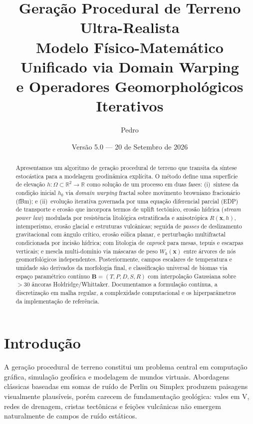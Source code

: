 \documentclass[11pt,a4paper]{article}
\title{%
  \textbf{Geração Procedural de Terreno Ultra-Realista}\\[0.4em]
  \large Modelo Físico-Matemático Unificado via Domain Warping\\
  e Operadores Geomorphológicos Iterativos
}
\author{Pedro}
\date{Versão 5.0 --- 20 de Setembro de 2026}
\begin{document}
\maketitle

\begin{abstract}
Apresentamos um algoritmo de geração procedural de terreno que transita da síntese estocástica
para a modelagem geodinâmica explícita. O método define uma superfície de elevação
$h : \Omega \subset \mathbb{R}^2 \to \mathbb{R}$ como solução de um processo em duas fases:
(i)~síntese da condição inicial $h_0$ via \emph{domain warping} fractal sobre movimento
browniano fracionário (fBm); e (ii)~evolução iterativa governada por uma equação diferencial
parcial (EDP) de transporte e erosão que incorpora termos de uplift tectônico, erosão hídrica
(\emph{stream power law}) modulada por resistência litológica estratificada e anisotrópica
$R(\mathbf{x}, h)$, intemperismo, erosão glacial e estruturas vulcânicas; seguida de
\emph{passes} de deslizamento gravitacional com ângulo crítico, erosão eólica planar,
e perturbação multifractal condicionada por incisão hídrica; com litologia de \emph{caprock}
para mesas, tepuis e escarpas verticais; e mescla multi-domínio via máscaras de peso
$W_k(\mathbf{x})$ entre árvores de nós geomorfológicos independentes.
Posteriormente, campos escalares de temperatura e umidade são derivados da morfologia final,
e classificação universal de biomas via espaço paramétrico contínuo
$\mathbf{B} = (T, P, D, S, R)$ com interpolação Gaussiana sobre ${>}30$ âncoras Holdridge/Whittaker.
Documentamos a formulação contínua, a discretização em malha regular, a complexidade
computacional e os hiperparâmetros da implementação de referência.
\end{abstract}

\tableofcontents
\newpage

\section{Introdução}

A geração procedural de terreno constitui um problema central em computação gráfica,
simulação geofísica e modelagem de mundos virtuais. Abordagens clássicas baseadas em
somas de ruído de Perlin ou Simplex produzem paisagens visualmente plausíveis, porém carecem
de fundamentação geológica: vales em V, redes de drenagem, cristas tectônicas e feições
vulcânicas não emergem naturalmente de campos de ruído estáticos.
\end{document}
